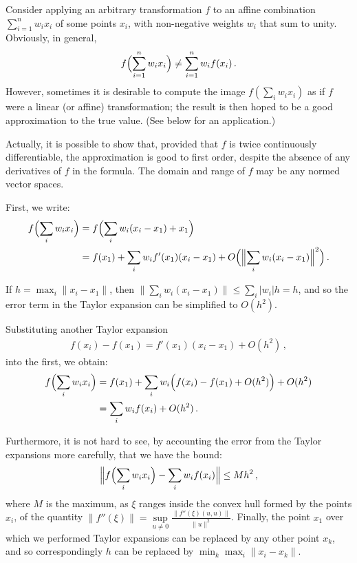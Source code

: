 \documentclass[12pt]{article}
\providecommand{\abs}[1]{\lvert#1\rvert}
\providecommand{\norm}[1]{\lVert#1\rVert}
\providecommand{\normB}[1]{\Bigl\lVert#1\Bigr\rVert}
\begin{document}


Consider 
applying an arbitrary transformation $f$ 
to an affine combination $\sum_{i=1}^n w_i x_i$
of some points $x_i$,
with non-negative weights $w_i$ that sum to unity.
Obviously, in general, 
\[
f \Bigl( \sum_{i=1}^n w_i x_i \Bigr) 
\neq \sum_{i=1}^n w_i f(x_i)\,.
\]
However, sometimes it is desirable to compute the image
$f(\sum_i w_i x_i)$
as if $f$ were a linear (or affine) transformation; 
the result is then hoped to be a good approximation
to the true value.
(See below for an application.)

Actually, it is possible to show that, provided that $f$ is twice 
continuously differentiable, the approximation is good to first order,
despite the absence of any derivatives of $f$ in the formula.
The domain and range of $f$ may be any normed vector spaces.

First, we write:
\begin{align*}
f\Bigl( \sum_i w_i x_i \Bigr) 
&= f\Bigl( \sum_i w_i (x_i - x_1) + x_1 \Bigr) \\
&= f(x_1) + \sum_i w_i f'(x_1) (x_i - x_1) + O\Bigl( \normB{ \sum_i w_i (x_i - x_1)}^2 \Bigr)\,.
\end{align*}

If $h = \max_i \norm{x_i - x_1}$,
then $\norm{ \sum_i w_i (x_i - x_1) } \leq \sum_i \abs{w_i} h = h$,
and so the error term in the Taylor expansion
can be simplified to $O(h^2)$.

Substituting another Taylor expansion
\begin{align*}
f(x_i) - f(x_1) = f'(x_1) (x_i - x_1) + O(h^2)\,,
\end{align*}
into the first, we obtain:
\begin{align*}
f\Bigl( \sum_i w_i x_i \Bigr)
&= f(x_1) + \sum_i w_i \Bigl( f(x_i) - f(x_1) + O(h^2) \Bigr) + O(h^2) \\
&= \sum_i w_i f(x_i) + O(h^2)\,.
\end{align*}

Furthermore, it is not hard to see,
by accounting the error from the Taylor expansions more carefully,
that we have the bound:
\[
\normB{ f\Bigl( \sum_i w_i x_i \Bigr) - \sum_i w_i f(x_i) } \leq
M h^2\,,
\]
where $M$ is the maximum,
as $\xi$ ranges inside the convex hull
formed by the points $x_i$,
of the quantity $\norm{f''(\xi)} = 
\sup\limits_{u \neq 0} \frac{\norm{f''(\xi)(u,u)}}{\norm{u}^2}$.
Finally, the point $x_1$ over which we performed Taylor expansions
can be replaced by any other point $x_k$,
and so correspondingly $h$ can be replaced by $\min_k \max_i \norm{x_i - x_k}$.
\end{document}
